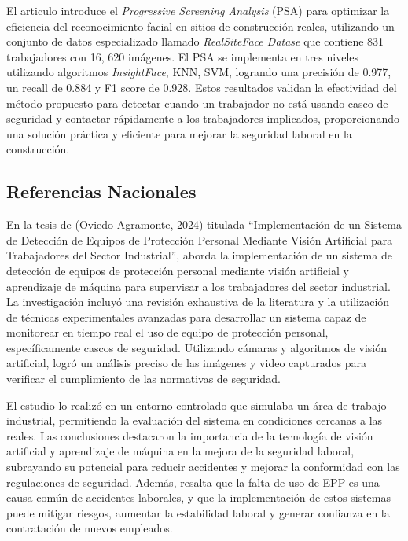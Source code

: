 \noindent
El articulo introduce el \textit{Progressive Screening Analysis} (PSA) para optimizar la eficiencia del reconocimiento facial en sitios de construcción reales, utilizando un conjunto de datos especializado llamado \textit{RealSiteFace Datase} que contiene 831 trabajadores con 16, 620 imágenes. El PSA se implementa en tres niveles utilizando algoritmos \textit{InsightFace}, KNN, SVM, logrando una precisión de 0.977, un recall de 0.884 y F1 score de 0.928. Estos resultados validan la efectividad del método propuesto para detectar cuando un trabajador no está usando casco de seguridad y contactar rápidamente a los trabajadores implicados, proporcionando una solución práctica y eficiente para mejorar la seguridad laboral en la construcción.

\subsection{Referencias Nacionales}

En la tesis de (Oviedo Agramonte, 2024) \cite{oviedo2024implementacion} titulada ``Implementación de un Sistema de Detección de Equipos de Protección Personal Mediante Visión Artificial para Trabajadores del Sector Industrial'', aborda la implementación de un sistema de detección de equipos de protección personal mediante visión artificial y aprendizaje de máquina para supervisar a los trabajadores del sector industrial. La investigación incluyó una revisión exhaustiva de la literatura y la utilización de técnicas experimentales avanzadas para desarrollar un sistema capaz de monitorear en tiempo real el uso de equipo de protección personal, específicamente cascos de seguridad. Utilizando cámaras y algoritmos de visión artificial, logró un análisis preciso de las imágenes y video capturados para verificar el cumplimiento de las normativas de seguridad.

\noindent
El estudio lo realizó en un entorno controlado que simulaba un área de trabajo industrial, permitiendo la evaluación del sistema en condiciones cercanas a las reales. Las conclusiones destacaron la importancia de la tecnología de visión artificial y aprendizaje de máquina en la mejora de la seguridad laboral, subrayando su potencial para reducir accidentes y mejorar la conformidad con las regulaciones de seguridad. Además, resalta que la falta de uso de EPP es una causa común de accidentes laborales, y que la implementación de estos sistemas puede mitigar riesgos, aumentar la estabilidad laboral y generar confianza en la contratación de nuevos empleados.

